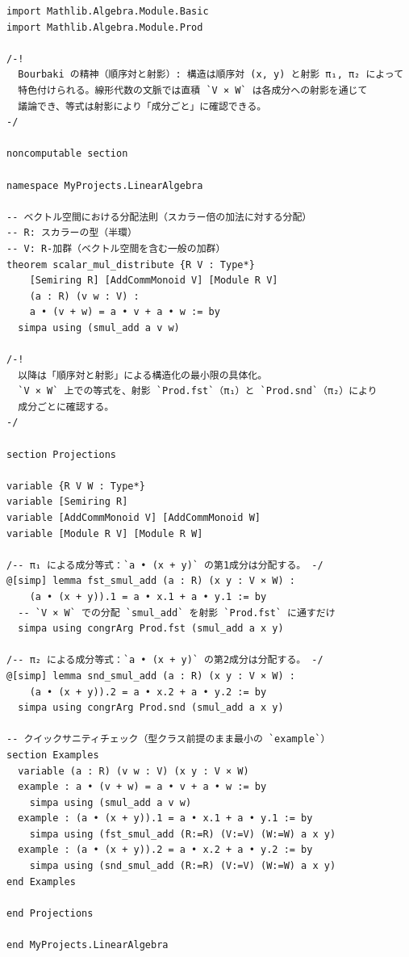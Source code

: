 \documentclass[12pt]{article}
\begin{document}
\begin{lstlisting}
import Mathlib.Algebra.Module.Basic
import Mathlib.Algebra.Module.Prod

/-!
  Bourbaki の精神（順序対と射影）: 構造は順序対 (x, y) と射影 π₁, π₂ によって
  特色付けられる。線形代数の文脈では直積 `V × W` は各成分への射影を通じて
  議論でき、等式は射影により「成分ごと」に確認できる。
-/

noncomputable section

namespace MyProjects.LinearAlgebra

-- ベクトル空間における分配法則（スカラー倍の加法に対する分配）
-- R: スカラーの型（半環）
-- V: R-加群（ベクトル空間を含む一般の加群）
theorem scalar_mul_distribute {R V : Type*}
    [Semiring R] [AddCommMonoid V] [Module R V]
    (a : R) (v w : V) :
    a • (v + w) = a • v + a • w := by
  simpa using (smul_add a v w)

/-!
  以降は「順序対と射影」による構造化の最小限の具体化。
  `V × W` 上での等式を、射影 `Prod.fst`（π₁）と `Prod.snd`（π₂）により
  成分ごとに確認する。
-/

section Projections

variable {R V W : Type*}
variable [Semiring R]
variable [AddCommMonoid V] [AddCommMonoid W]
variable [Module R V] [Module R W]

/-- π₁ による成分等式：`a • (x + y)` の第1成分は分配する。 -/
@[simp] lemma fst_smul_add (a : R) (x y : V × W) :
    (a • (x + y)).1 = a • x.1 + a • y.1 := by
  -- `V × W` での分配 `smul_add` を射影 `Prod.fst` に通すだけ
  simpa using congrArg Prod.fst (smul_add a x y)

/-- π₂ による成分等式：`a • (x + y)` の第2成分は分配する。 -/
@[simp] lemma snd_smul_add (a : R) (x y : V × W) :
    (a • (x + y)).2 = a • x.2 + a • y.2 := by
  simpa using congrArg Prod.snd (smul_add a x y)

-- クイックサニティチェック（型クラス前提のまま最小の `example`）
section Examples
  variable (a : R) (v w : V) (x y : V × W)
  example : a • (v + w) = a • v + a • w := by
    simpa using (smul_add a v w)
  example : (a • (x + y)).1 = a • x.1 + a • y.1 := by
    simpa using (fst_smul_add (R:=R) (V:=V) (W:=W) a x y)
  example : (a • (x + y)).2 = a • x.2 + a • y.2 := by
    simpa using (snd_smul_add (R:=R) (V:=V) (W:=W) a x y)
end Examples

end Projections

end MyProjects.LinearAlgebra

\end{lstlisting}
\end{document}
